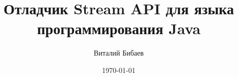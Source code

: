 \documentclass{beamer}
\title[]{Отладчик Stream API для языка программирования Java} %
\author{Виталий Бибаев} %
\institute[СПБАУ] %
{
Санкт-Петербургский академический университет \\ %
\medskip
\textit{vitaliy.bibaev@gmail.com} %
}
\date{\today} %
\begin{document}
\begin{frame}
\titlepage %
\end{frame}




%
\end{document}
